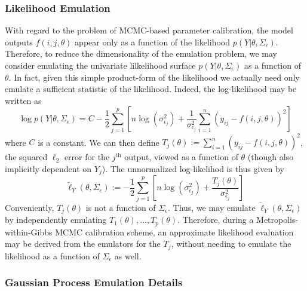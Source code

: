\documentclass[
]{article}
\begin{document}
\hypertarget{likelihood-emulation}{%
\subsubsection{Likelihood Emulation}\label{likelihood-emulation}}

With regard to the problem of MCMC-based parameter calibration, the
model outputs \(f(i, j, \theta)\) appear only as a function of the
likelihood \(p(Y|\theta, \Sigma_\epsilon)\). Therefore, to reduce the
dimensionality of the emulation problem, we may consider emulating the
univariate lilkelihood surface \(p(Y|\theta, \Sigma_\epsilon)\) as a
function of \(\theta\). In fact, given this simple product-form of the
likelihood we actually need only emulate a sufficient statistic of the
likelihood. Indeed, the log-likelihood may be written as
\[\log p(Y|\theta, \Sigma_\epsilon) = C - \frac{1}{2}\sum_{j = 1}^{p}\left[n\log(\sigma^2_{\epsilon_j}) + \frac{1}{\sigma^2_{\epsilon_j}}\sum_{i = 1}^{n}(y_{ij} - f(i, j, \theta))^2 \right]\]
where \(C\) is a constant. We can then define
\(T_j(\theta) := \sum_{i = 1}^{n}(y_{ij} - f(i, j, \theta))^2\), the
squared \(\ell_2\) error for the \(j^{\text{th}}\) output, viewed as a
function of \(\theta\) (though also implicitly dependent on \(Y_j\)).
The unnormalized log-likelihod is thus given by
\[\tilde{\ell}_Y(\theta, \Sigma_\epsilon) := -\frac{1}{2}\sum_{j = 1}^{p}\left[n\log(\sigma^2_{\epsilon_j}) + \frac{T_j(\theta)}{\sigma^2_{\epsilon_j}}\right]\]
Conveniently, \(T_j(\theta)\) is not a function of \(\Sigma_\epsilon\).
Thus, we may emulate \(\tilde{\ell}_Y(\theta, \Sigma_\epsilon)\) by
independently emulating \(T_1(\theta), \dots, T_p(\theta)\). Therefore,
during a Metropolis-within-Gibbs MCMC calibration scheme, an approximate
likelihood evaluation may be derived from the emulators for the \(T_j\),
without needing to emulate the likelihood as a function of
\(\Sigma_\epsilon\) as well.

\hypertarget{gaussian-process-emulation-details}{%
\subsubsection{Gaussian Process Emulation
Details}\label{gaussian-process-emulation-details}}
\end{document}
